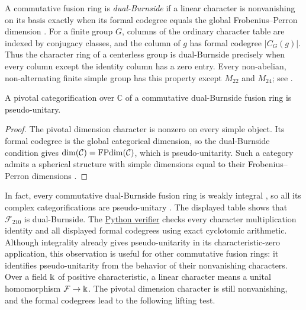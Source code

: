 \documentclass{amsart}
\begin{document}
\label{defdualburn}A commutative fusion ring is \emph{dual-Burnside} if a linear character
is nonvanishing on its basis exactly when its formal codegree equals the
global Frobenius--Perron dimension \cite[\S12.2]{BuPa23}.
For a finite group $G$, columns of the ordinary character table are indexed
by conjugacy classes, and the column of $g$ has formal codegree $|C_G(g)|$.
Thus the character ring of a centerless group is dual-Burnside precisely
when every column except the identity column has a zero entry.
Every non-abelian, non-alternating finite simple group has this property
except $M_{22}$ and $M_{24}$; see \cite[\S12.2]{BuPa23}.

\begin{lemma}\label{lem:DualBurnPseudoU}
A pivotal categorification over $\mathbb C$ of a commutative dual-Burnside
fusion ring is pseudo-unitary.
\end{lemma}
\begin{proof}
The pivotal dimension character is nonzero on every simple object.
Its formal codegree is the global categorical dimension, so the
dual-Burnside condition gives
$\dim(\mathcal{C})=\mathrm{FPdim}(\mathcal{C})$, which is pseudo-unitarity. Such a category admits
a spherical structure with simple dimensions equal to their Frobenius--Perron
dimensions \cite[Proposition~9.5.1]{EGNO15}.
\end{proof}
In fact, every commutative dual-Burnside fusion ring is weakly integral \cite[Theorem~1.13 and the following discussion]{BuPa23}, so all its complex categorifications are pseudo-unitary \cite[Proposition~9.6.5]{EGNO15}.
The displayed table shows that $\mathcal F_{210}$ is dual-Burnside. The \href{https://github.com/sebastienpalcoux/triangular-prism-categorification/blob/f816c697fde088b261e1fe1ce703980e5dbdab51/verify_f210_characters.py}{Python verifier} checks every character multiplication identity and all displayed formal codegrees using exact cyclotomic arithmetic.
Although integrality already gives pseudo-unitarity in its characteristic-zero
application, this observation is useful for other commutative fusion rings:
it identifies pseudo-unitarity from the behavior of their nonvanishing
characters. Over a field $\Bbbk$ of positive characteristic, a linear character means
a unital homomorphism $\mathcal F\to\Bbbk$. The pivotal dimension character is
still nonvanishing, and the formal codegrees lead to the following lifting test.
\end{document}
